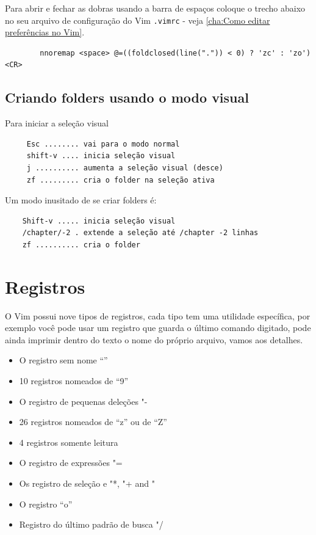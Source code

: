 \documentclass[10pt,a4paper,openany]{book}
\begin{document}
Para abrir e fechar as dobras usando a barra de
espaços coloque o trecho abaixo no seu arquivo de configuração do Vim
\verb|.vimrc| - veja \ref{cha:Como editar preferências no Vim}.

\begin{verbatim}
		nnoremap <space> @=((foldclosed(line(".")) < 0) ? 'zc' : 'zo')<CR>
\end{verbatim}

\section{Criando folders usando o modo visual}
\label{Criando folders usando o modo visual}
Para iniciar a seleção visual

\begin{verbatim}
	 Esc ........ vai para o modo normal
	 shift-v .... inicia seleção visual
	 j .......... aumenta a seleção visual (desce)
	 zf ......... cria o folder na seleção ativa
\end{verbatim}

Um modo inusitado de se criar folders é:

\begin{verbatim}
	Shift-v ..... inicia seleção visual
	/chapter/-2 . extende a seleção até /chapter -2 linhas
	zf .......... cria o folder
\end{verbatim}

\chapter{Registros}
\label{Registros}

O Vim possui nove tipos de registros, cada tipo tem uma utilidade
específica, por exemplo você pode usar um registro que guarda o último
comando digitado, pode ainda imprimir dentro do texto o nome do
próprio arquivo, vamos aos detalhes.

\begin{itemize}
	\item O registro sem nome ``''
	\item 10 registros nomeados de ``9''
	\item O registro de pequenas deleções "-
	\item 26 registros nomeados de ``z'' ou de ``Z''
	\item 4 registros somente leitura
	\item O registro de expressões "=
	\item Os registro de seleção e  "*, "+ and "~
	\item O registro ``o''
	\item Registro do último padrão de busca "/
\end{itemize}
\end{document}
